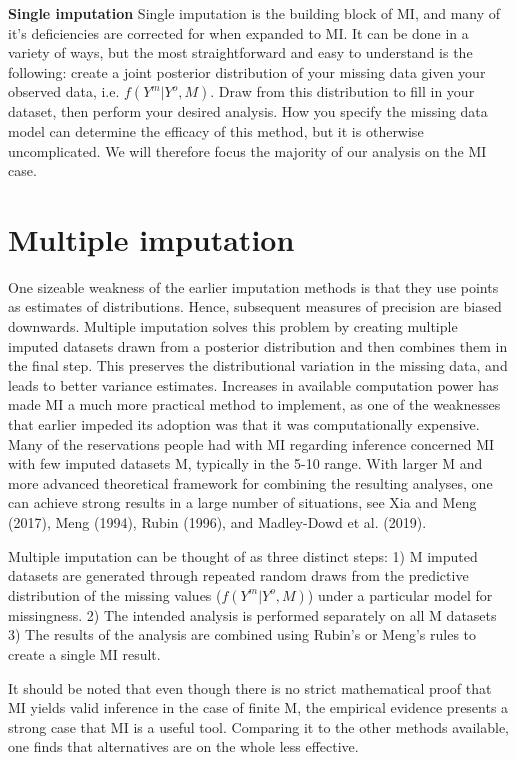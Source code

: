 \documentclass{article}
\begin{document}
	
	\textbf{Single imputation}
	Single imputation is the building block of MI, and many of it's deficiencies are corrected for when expanded to MI. It can be done in a variety of ways, but the most straightforward and easy to understand is the following: create a joint posterior distribution of your missing data given your observed data, i.e. $f(Y^{m}|Y^{o}, M)$. Draw from this distribution to fill in your dataset, then perform your desired analysis. How you specify the missing data model can determine the efficacy of this method, but it is otherwise uncomplicated. We will therefore focus the majority of our analysis on the MI case.
	
	\section{Multiple imputation}
	One sizeable weakness of the earlier imputation methods is that they use points as estimates of distributions. Hence, subsequent measures of precision are biased downwards. Multiple imputation solves this problem by creating multiple imputed datasets drawn from a posterior distribution and then combines them in the final step. This preserves the distributional variation in the missing data, and leads to better variance estimates. Increases in available computation power has made MI a much more practical method to implement, as one of the weaknesses that earlier impeded its adoption was that it was computationally expensive. Many of the reservations people had with MI regarding inference concerned MI with few imputed datasets M, typically in the 5-10 range. With larger M and more advanced theoretical framework for combining the resulting analyses, one can achieve strong results in a large number of situations, see Xia and Meng (2017), Meng (1994), Rubin (1996), and Madley-Dowd et al. (2019).
	
	Multiple imputation can be thought of as three distinct steps:
	1) M imputed datasets are generated through repeated random draws from the predictive distribution of the missing values ($f(Y^{m}|Y^{o}, M)$) under a particular model for missingness.
	2) The intended analysis is performed separately on all M datasets
	3) The results of the analysis are combined using Rubin's or Meng's rules to create a single MI result. 	
	
	It should be noted that even though there is no strict mathematical proof that MI yields valid inference in the case of finite M, the empirical evidence presents a strong case that MI is a useful tool. Comparing it to the other methods available, one finds that alternatives are on the whole less effective. %
	
\end{document}
